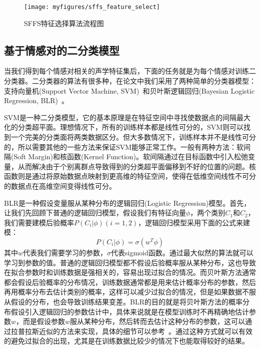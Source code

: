 \begin{figure}[htb] %
    \centering
    \texttt{[image: myfigures/sffs\_feature\_select]}
    \caption{SFFS特征选择算法流程图}
    \label{fig:sffs_feature_select}
\end{figure}

\subsection{基于情感对的二分类模型}
\label{ssec:emo_pair_bi_cls}

当我们得到每个情感对相关的声学特征集后，下面的任务就是为每个情感对训练二分类器。二分类器的算法有很多种，在论文中我们采用了两种简单的分类器模型：支持向量机(Support Vector Machine, SVM)~\cite{Burges2008A}和贝叶斯逻辑回归(Bayesian Logistic Regression, BLR)~\cite{Genkin2007Large}。

SVM是一种二分类模型，它的基本原理是在特征空间中寻找使数据点的间隔最大化的分类超平面。理想情况下，所有的训练样本都是线性可分的，SVM则可以找到一个完美的分类面将两类数据区分。但大多数情况下，训练样本并不是线性可分的，所以需要其他的一些方法来保证SVM能够正常工作。一般有两种方法：软间隔(Soft Margin)和核函数(Kernel Function)。软间隔通过在目标函数中引入松弛变量，从而解决由于个别离群点导致得到的分类超平面偏移到不好的位置的问题。核函数则是通过将原始数据点映射到更高维的特征空间，使得在低维空间线性不可分的数据点在高维空间变得线性可分。

 BLR是一种假设变量服从某种分布的逻辑回归(Logistic Regression)模型。首先，让我们先回顾下普通的逻辑回归模型，假设我们有特征向量$\phi$，两个类别$C_1$和$C_2$，我们需要建模后验概率$P(C_i|\phi)(i=1,2)$，逻辑回归模型采用下面的公式来建模：
 \begin{equation}
\label{equ:lagrange_multiplier}
    P(C_i|\phi) = \sigma(w^T\phi)
\end{equation}
其中$w$代表我们需要学习的参数，$\sigma$代表sigmoid函数。通过最大似然的算法就可以学习到参数的值。普通的逻辑回归模型都不假设后验概率服从某种分布，这也导致在拟合参数时和训练数据是强相关的，容易出现过拟合的情况。而贝叶斯方法通常都会假设后验概率的分布情况，训练数据通常都是用来估计概率分布的参数，然后再用概率分布去估计类别的概率，这样可以减少过拟合的情况，但是如果数据不服从假设的分布，也会导致训练结果变差。BLR的目的就是将贝叶斯方法的概率分布假设引入逻辑回归的参数估计中，具体来说就是在模型训练时不再精确地估计参数$w$，而是假设参数$w$服从某种分布，然后转而去估计这种分布的参数，这可以通过拉普拉斯近似的方法来实现，具体的细节可以参考~\cite{Genkin2007Large}。通过这种方式就可以有效的避免过拟合的出现，尤其是在训练数据比较少的情况下也能取得较好的结果。

